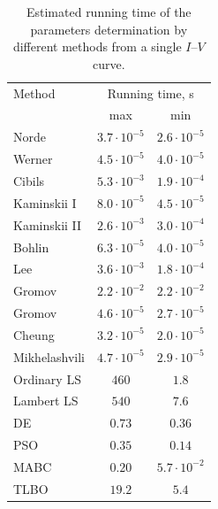 \documentclass[aip,jap,reprint]{revtex4-1}
\begin{document}
\begin{table}
\caption{\label{tab}Estimated running time of the parameters determination by different methods from a single $I$--$V$ curve.}
\begin{ruledtabular}
\begin{tabular}{lcc}
Method &\multicolumn{2}{c}{Running time, s}\\
 &max&min\\
\hline
Norde &$3.7\cdot10^{-5}$&$2.6\cdot10^{-5}$\\
Werner\footnotemark[1] &$4.5\cdot10^{-5}$&$4.0\cdot10^{-5}$\\
Cibils\footnotemark[1] &$5.3\cdot10^{-3}$&$1.9\cdot10^{-4}$\\
Kaminskii I\footnotemark[1] &$8.0\cdot10^{-5}$&$4.5\cdot10^{-5}$\\
Kaminskii II\footnotemark[1] &$2.6\cdot10^{-3}$&$3.0\cdot10^{-4}$\\
Bohlin &$6.3\cdot10^{-5}$&$4.0\cdot10^{-5}$\\
Lee &$3.6\cdot10^{-3}$&$1.8\cdot10^{-4}$\\
Gromov &$2.2\cdot10^{-2}$&$2.2\cdot10^{-2}$\\
Gromov\footnotemark[2] &$4.6\cdot10^{-5}$&$2.7\cdot10^{-5}$\\
Cheung &$3.2\cdot10^{-5}$&$2.0\cdot10^{-5}$\\
Mikhelashvili &$4.7\cdot10^{-5}$&$2.9\cdot10^{-5}$\\
Ordinary LS &$460$&$1.8$\\
Lambert LS &$540$&$7.6$\\
DE &$0.73$&$0.36$\\
PSO &$0.35$&$0.14$\\
MABC &$0.20$&$5.7\cdot10^{-2}$\\
TLBO &$19.2$&$5.4$
\end{tabular}
\end{ruledtabular}
\end{table}
\end{document}
